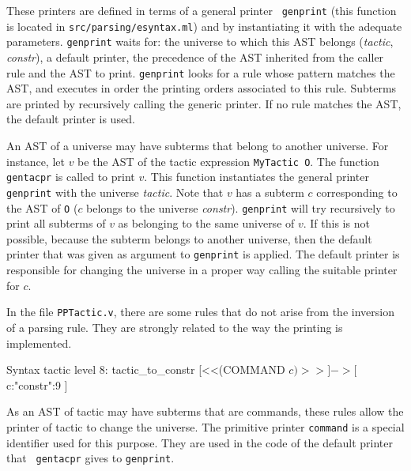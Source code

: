 These printers are defined in terms of a general printer {\tt
genprint} (this function is located in {\tt src/parsing/esyntax.ml})
and by instantiating it with the adequate parameters. {\tt genprint}
waits for: the universe to which this AST belongs ({\it tactic}, {\it
constr}), a default printer, the precedence of the AST inherited from
the caller rule and the AST to print. {\tt genprint} looks for a rule
whose pattern matches the AST, and executes in order the printing
orders associated to this rule. Subterms are printed by recursively
calling the generic printer. If no rule matches the AST, the default
printer is used.

An AST of a universe may have subterms that belong to another
universe. For instance, let $v$ be the AST of the tactic
expression \verb+MyTactic O+. The function {\tt gentacpr} is called
to print $v$.  This function instantiates the general printer {\tt
genprint} with the universe {\it tactic}. Note that $v$ has a subterm
$c$ corresponding to the AST of \verb+O+ ($c$ belongs to the universe
{\it constr}).  {\tt genprint} will try recursively to print all
subterms of $v$ as belonging to the same universe of $v$. If this is
not possible, because the subterm belongs to another universe, then
the default printer that was given as argument to {\tt genprint} is
applied. The default printer is responsible for changing the universe
in a proper way calling the suitable printer for $c$.

\medskip{} In the file
\verb+PPTactic.v+, there are some rules that do not arise from the
inversion of a parsing rule. They are strongly related to the way the
printing is implemented.

\begin{coq_example*}
Syntax tactic level 8:
    tactic_to_constr [<<(COMMAND $c)>>] -> [ $c:"constr":9 ]
\end{coq_example*}

As an AST of tactic may have subterms that are commands, these rules
allow the printer of tactic to change the universe. The primitive printer
{\tt command} is a special identifier used for this
purpose. They are used in the code of the default printer that {\tt
gentacpr} gives to {\tt genprint}.




